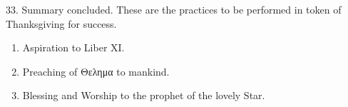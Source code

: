 33. Summary concluded. These are the practices to be performed in token of Thanksgiving for success.
\begin{enumerate}[leftmargin=4\parindent]
\item Aspiration to Liber XI.
\item Preaching of \textgreek{Θελημα} to mankind.
\item Blessing and Worship to the prophet of the lovely Star.
\end{enumerate}

